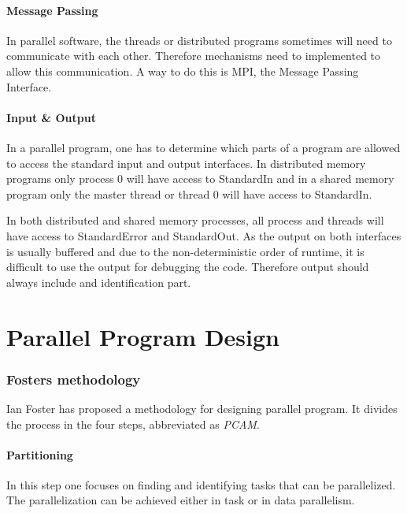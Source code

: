 \documentclass{article}
\begin{document}
\paragraph*{Message Passing} %
\label{par:message_passing}
	In parallel software,
	the threads or distributed programs sometimes will need to communicate with each other.
	Therefore mechanisms need to implemented to allow this communication.
	A way to do this is MPI, the Message Passing Interface.

\paragraph*{Input \& Output} %
\label{par:input_&_output}
	In a parallel program,
	one has to determine which parts of a program are allowed to access the standard input and output interfaces.
	In distributed memory programs only process 0 will have access to StandardIn
	and in a shared memory program only the master thread
	or thread 0 will have access to StandardIn.

	In both distributed and shared memory processes,
	all process and threads will have access to StandardError and StandardOut.
	As the output on both interfaces is usually buffered
	and due to the non-deterministic order of runtime,
	it is difficult to use the output for debugging the code.
	Therefore output should always include and identification part.
\section{Parallel Program Design} %
\label{sec:parallel_program_design}

\subsubsection{Fosters methodology} %
\label{ssub:fosters_methodology}
Ian Foster has proposed a methodology for designing parallel program.
It divides the process in the four steps,
abbreviated as \textsl{PCAM}.

\paragraph{Partitioning} %
\label{par:partitioning}
	In this step one focuses on finding
	and identifying tasks that can be parallelized.
	The parallelization can be achieved either in task
	or in data parallelism.
\end{document}
